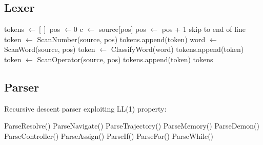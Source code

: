 \documentclass[twocolumn,10pt]{article}
\theoremstyle{definition}
\theoremstyle{remark}
\begin{document}
\subsection{Lexer}

\begin{algorithm}
\caption{vaHera Lexer}
\begin{algorithmic}[1]
    \State tokens $\gets []$
    \State pos $\gets 0$
        \State c $\gets$ source[pos]
            \State pos $\gets$ pos + 1
            \State skip to end of line
            \State token $\gets$ ScanNumber(source, pos)
            \State tokens.append(token)
            \State word $\gets$ ScanWord(source, pos)
            \State token $\gets$ ClassifyWord(word)
            \State tokens.append(token)
        \Else
            \State token $\gets$ ScanOperator(source, pos)
            \State tokens.append(token)
        \EndIf
    \EndWhile
    \State \Return tokens
\EndFunction
\end{algorithmic}
\end{algorithm}

\subsection{Parser}

Recursive descent parser exploiting LL(1) property:

\begin{algorithm}
\caption{vaHera Parser}
\begin{algorithmic}[1]
            \State \Return ParseResolve()
        \EndCase
            \State \Return ParseNavigate()
        \EndCase
            \State \Return ParseTrajectory()
        \EndCase
            \State \Return ParseMemory()
        \EndCase
            \State \Return ParseDemon()
        \EndCase
            \State \Return ParseController()
        \EndCase
            \State \Return ParseAssign()
        \EndCase
            \State \Return ParseIf()
        \EndCase
            \State \Return ParseFor()
        \EndCase
            \State \Return ParseWhile()
        \EndCase
    \EndSwitch
\EndFunction
\end{algorithmic}
\end{algorithm}
\end{document}
